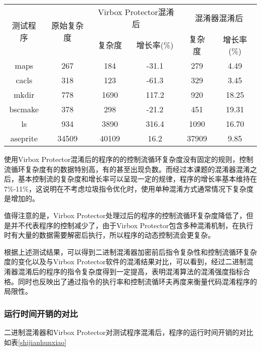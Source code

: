 \begin{table}[htbp]
	\centering
	\begin{tabular}{c|c|cc|cc}
		\bottomrule[1.5pt]
		\multirow{2}{*}{测试程序} & \multirow{2}{*}{原始复杂度} & \multicolumn{2}{c|}{Virbox Protector混淆后} & \multicolumn{2}{c}{混淆器混淆后} \\ \cline{3-6} 
		&       & 复杂度   & 增长率(\%) & 复杂度   & 增长率(\%) \\ \hline
		maps     & 267   & 184   & -31.1   & 279   & 4.49    \\
		cacls    & 318   & 123   & -61.3   & 329   & 3.45    \\
		mkdir    & 778   & 1690  & 117.2   & 920   & 18.25   \\
		bscmake  & 378   & 298   & -21.2   & 451   & 19.31   \\
		ls       & 934   & 3890  & 316.4   & 1090  & 16.70   \\
		aseprite & 34509 & 40109 & 16.2    & 37909 & 9.85    \\ 
		\toprule[1.5pt]
	\end{tabular}

	\label{protector_2}
\end{table}

使用Virbox Protector混淆后的程序的的控制流循环复杂度没有固定的规则，控制流循环复杂度有的数据特别高，有的甚至出现负数。而经过本课题的混淆器混淆之后，基本控制流的复杂度和增长率可以呈现一定的规律，程序的增长率基本维持在7$\%$-11$\%$，这说明在不考虑垃圾指令优化时，使用单种混淆方式通常情况下复杂度是增加的。

值得注意的是，Virbox Protector处理过后的程序的控制流循环复杂度降低了，但是并不代表程序的控制减少了，由于Virbox Protector包含多种混淆机制，在执行时有大量的数据需要解密后执行，所以程序的动态控制流会更复杂。

根据上述测试结果，可以得到二进制混淆器加密前后指令复杂性和控制流循环复杂度的变化以及与Virbox Protector软件的混淆结果对比，可以看到，经过二进制混淆器混淆后的程序的指令复杂度得到一定提高，表明混淆算法的混淆强度指标合格。同时也反映出了通过指令的执行率和控制流循环夫再度来衡量代码混淆程序的局限性。

\subsubsection{运行时间开销的对比}


二进制混淆器和Virbox Protector对测试程序混淆后，程序的运行时间开销的对比如表\ref{shijianhunxiao}


